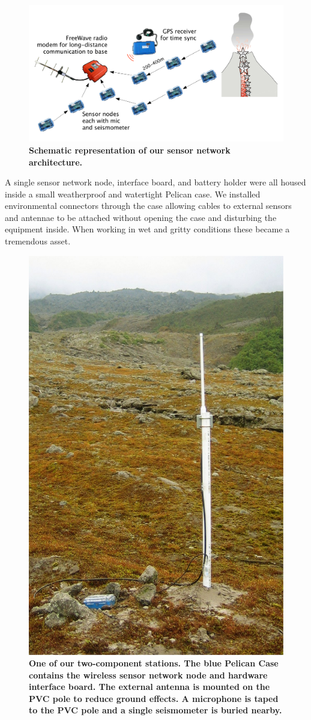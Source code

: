 \begin{figure}[t]
\label{casestudy-fig-picture}
\begin{center}
\includegraphics[width=0.7\hsize]{./4-architecture/figs/schematic}
\end{center}
\caption{\textbf{Schematic representation of our sensor network
architecture.}}
\end{figure}

A single sensor network node, interface board, and battery holder were all
housed inside a small weatherproof and watertight Pelican case.  We installed
environmental connectors through the case allowing cables to external sensors
and antennae to be attached without opening the case and disturbing the
equipment inside.  When working in wet and gritty conditions these became a
tremendous asset.

\begin{figure}[t]
\begin{center}
\includegraphics[width=0.7\hsize]{./4-architecture/figs/Station}
\end{center}
\caption{\textbf{One of our two-component stations.  The blue Pelican
Case contains the wireless sensor network node and hardware interface board.
The external antenna is mounted on the PVC pole to reduce ground effects.
A microphone is taped to the PVC pole and a single seismometer is buried
nearby.}}
\label{fig-station}
\end{figure}

